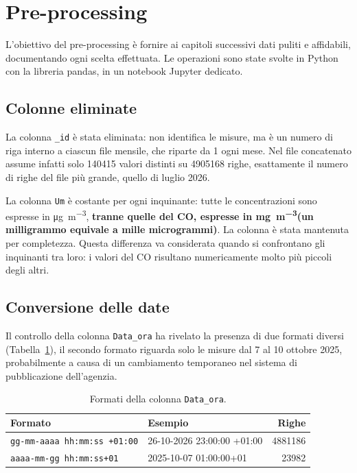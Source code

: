 \documentclass[11pt]{report}
\newcommand{\ugm}{\si{\micro\gram\per\cubic\metre}}
\newcommand{\mgm}{\si{\milli\gram\per\cubic\metre}}
\begin{document}
\section{Pre-processing}
\label{sec:preprocessing}

L'obiettivo del pre-processing è fornire ai capitoli successivi dati puliti e
affidabili, documentando ogni scelta effettuata. Le operazioni sono state
svolte in Python con la libreria pandas, in un notebook Jupyter dedicato.

\subsection{Colonne eliminate}
La colonna \texttt{\_id} è stata eliminata: non identifica le misure, ma è un
numero di riga interno a ciascun file mensile, che riparte da 1 ogni mese. Nel
file concatenato assume infatti solo \num{140415} valori distinti su
\num{4905168} righe, esattamente il numero di righe del file più grande, quello
di luglio 2026.

La colonna \texttt{Um} è costante per ogni inquinante: tutte le concentrazioni
sono espresse in \ugm, \textbf{tranne quelle del CO, espresse in \mgm (un milligrammo
equivale a mille microgrammi)}. La colonna è stata mantenuta per completezza.
Questa differenza va considerata quando si confrontano gli inquinanti tra loro:
i valori del CO risultano numericamente molto più piccoli degli altri.

\subsection{Conversione delle date}
Il controllo della colonna \texttt{Data\_ora} ha rivelato la presenza di due
formati diversi (Tabella~\ref{tab:formati_date}), il secondo formato riguarda solo le
misure dal 7 al 10 ottobre 2025, probabilmente a causa di un cambiamento
temporaneo nel sistema di pubblicazione dell'agenzia.

\begin{table}[H]
  \centering
  \caption{Formati della colonna \texttt{Data\_ora}.}
  \label{tab:formati_date}
  \begin{tabular}{l l r}
    \toprule
    \textbf{Formato}                    & \textbf{Esempio}           & \textbf{Righe} \\
    \midrule
    \texttt{gg-mm-aaaa hh:mm:ss +01:00} & 26-10-2026 23:00:00 +01:00 & \num{4881186}  \\
    \texttt{aaaa-mm-gg hh:mm:ss+01}     & 2025-10-07 01:00:00+01     & \num{23982}    \\
    \bottomrule
  \end{tabular}
\end{table}
\end{document}
